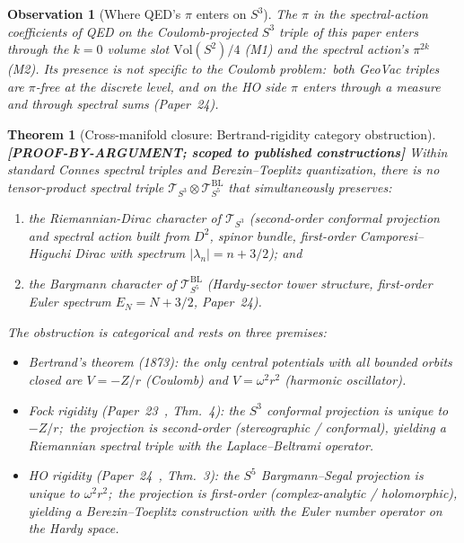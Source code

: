 \documentclass[11pt]{article}
\providecommand{\Tcal}{\mathcal{T}}
\providecommand{\sthree}{S^3}
\newtheorem{theorem}{Theorem}
\newtheorem{observation}{Observation}
\begin{document}
\begin{observation}[Where QED's $\pi$ enters on $S^3$]
\label{obs:pi_coulomb}
The $\pi$ in the spectral-action coefficients of QED on the
Coulomb-projected $S^3$ triple of this paper enters through the
$k = 0$ volume slot $\mathrm{Vol}(S^2)/4$ (M1) and the spectral
action's $\pi^{2k}$ (M2).  Its presence is not specific to the
Coulomb problem:\ both GeoVac triples are $\pi$-free at the discrete
level, and on the HO side $\pi$ enters through a measure and through
spectral sums (Paper~24).
\end{observation}

\begin{theorem}[Cross-manifold closure: Bertrand-rigidity category obstruction]%
\label{thm:g3_closure}
\textbf{[PROOF-BY-ARGUMENT; scoped to published constructions]}
Within standard Connes spectral triples and Berezin--Toeplitz
quantization, there is no tensor-product spectral triple
$\Tcal_{\sthree} \otimes \Tcal^{\mathrm{BL}}_{S^5}$
that simultaneously preserves:
\begin{enumerate}
\item[(a)] the Riemannian-Dirac character of $\Tcal_{\sthree}$
  (second-order conformal projection and spectral action built from
  $D^2$, spinor bundle, first-order Camporesi--Higuchi Dirac with
  spectrum $|\lambda_n| = n + 3/2$); and
\item[(b)] the Bargmann character of $\Tcal^{\mathrm{BL}}_{S^5}$
  (Hardy-sector tower structure,
  first-order Euler spectrum $E_N = N + 3/2$, Paper~24).
\end{enumerate}
The obstruction is categorical and rests on three premises:
\begin{itemize}
\item \emph{Bertrand's theorem (1873):}  the only central
  potentials with all bounded orbits closed are $V = -Z/r$
  (Coulomb) and $V = \omega^2 r^2$ (harmonic oscillator).
\item \emph{Fock rigidity (Paper~23~\cite{paper23}, Thm.~4):}
  the $\sthree$ conformal projection is unique to $-Z/r$;\ the
  projection is second-order (stereographic / conformal), yielding
  a Riemannian spectral triple with the Laplace--Beltrami
  operator.
\item \emph{HO rigidity (Paper~24~\cite{paper24}, Thm.~3):}
  the $S^5$ Bargmann--Segal projection is unique to $\omega^2 r^2$;\
  the projection is first-order (complex-analytic / holomorphic),
  yielding a Berezin--Toeplitz construction with the Euler number
  operator on the Hardy space.
\end{itemize}
\end{theorem}
\end{document}
